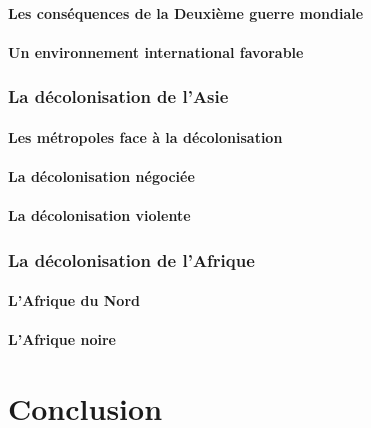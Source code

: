 \documentclass[12pt]{report}
\begin{document}
\subsection{Les conséquences de la Deuxième guerre mondiale}

\subsection{Un environnement international favorable}

\section{La décolonisation de l'Asie}

\subsection{Les métropoles face à la décolonisation}

\subsection{La décolonisation négociée}

\subsection{La décolonisation violente}

\section{La décolonisation de l'Afrique}

\subsection{L'Afrique du Nord}

\subsection{L'Afrique noire}


\part*{Conclusion}
\end{document}
